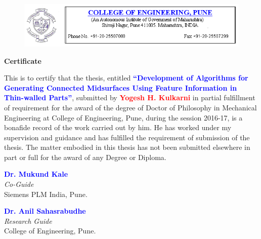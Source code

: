 \begin{figure} [!h]
	\centering
	\includegraphics[width=\textwidth]{images/coep_header.png}
\end{figure}

\vspace*{50pt}

\begin{center}{\Huge \textbf{Certificate}}\end{center}

\vspace*{20pt}

\begin{flushleft}
This is to certify that the thesis, entitled \textcolor{blue}{\textbf{``Development of Algorithms for Generating Connected Midsurfaces Using Feature Information in Thin-walled Parts''}}, submitted by \textcolor{red}{\textbf{Yogesh H. Kulkarni}} in partial fulfillment of requirement for the award of the degree of Doctor of Philosophy in Mechanical Engineering at College of Engineering, Pune, during the session 2016-17, is a bonafide record of the work carried out by him. He has worked under my supervision and guidance and has fulfilled the requirement of submission of the thesis. The matter embodied in this thesis has not been submitted elsewhere in part or full for the award of any Degree or Diploma.
\end{flushleft}

\vspace*{120pt}

\begin{minipage}[t]{0.5\textwidth}%
\begin{flushleft}
 \textcolor{blue}{\textbf{Dr. Mukund Kale}}\\
\emph{Co-Guide}\\
Siemens PLM India, Pune.
\end{flushleft}
\end{minipage}\hspace{0.5cm}
\begin{minipage}[t]{0.4\textwidth}%
\begin{flushleft}
 {
\textcolor{blue}{\textbf{Dr. Anil Sahasrabudhe}}\\
\emph{Research Guide}}\\
College of Engineering, Pune.
\end{flushleft}

\end{minipage}

